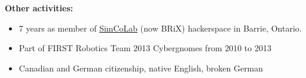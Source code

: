 \documentclass[fleqn,11pt]{article}
\newcommand{\itemoptions}{\setlength{\itemindent}{-10pt} \setlength\itemsep{-1em}}
\begin{document}
\light{\makebox[\linewidth]{\rule{\textwidth}{0.4pt}}}


%
\begin{tcolorbox}
	\textbf{Other activities:\\}
	\begin{itemize}\itemoptions
	\item 7 years as member of \href{https://www.facebook.com/simcolab/}{SimCoLab} (now BRiX) hackerspace in Barrie, Ontario. \\
	\item Part of FIRST Robotics Team 2013 Cybergnomes from 2010 to 2013\\
	\item Canadian and German citizenship, native English, broken German\\
	\end{itemize}
\end{tcolorbox}
%





\end{document}
